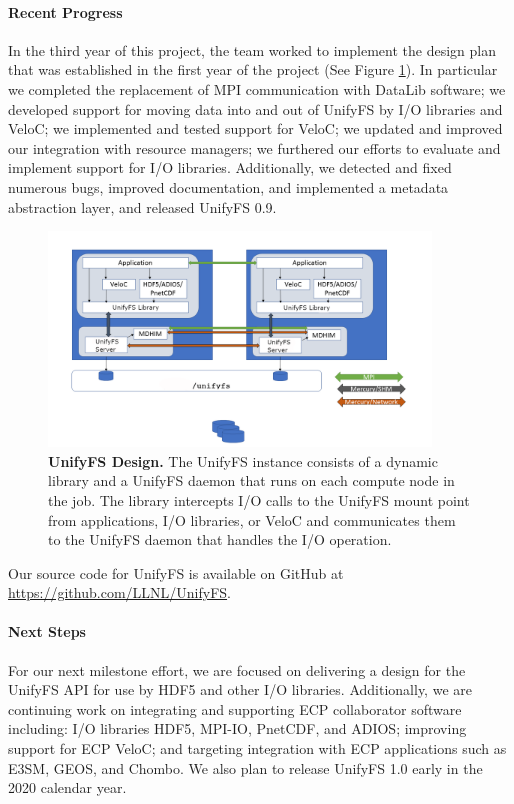 \paragraph{Recent Progress}

In the third year of this project, the team worked to implement the
design plan that was established in the first
year of the project (See Figure \ref{fig:milestone2}). In particular
we completed the replacement of MPI communication with DataLib software; we developed
support for moving data into and out of UnifyFS by I/O libraries and VeloC;
we implemented and tested support for VeloC; we updated and improved our integration
with resource managers; we furthered our efforts to evaluate and implement support for I/O 
libraries. Additionally, we detected and fixed numerous bugs, improved documentation, and
implemented a metadata abstraction layer, and released UnifyFS 0.9.
\begin{figure}[htb]
        \centering
        \includegraphics[width=4in]{projects/2.3.4-DataViz/2.3.4.15-HDF5-UnifyCR/milestone2}
        \caption{\label{fig:milestone2} \textbf{UnifyFS Design.} The UnifyFS
instance consists of a dynamic library and a UnifyFS daemon that runs
on each compute node in the job. The library intercepts I/O calls to
the UnifyFS mount point from applications, I/O libraries, or VeloC and communicates them to the UnifyFS daemon that handles the I/O operation.}
\end{figure}


Our source code for UnifyFS is available on 
GitHub at \url{https://github.com/LLNL/UnifyFS}. 
\paragraph{Next Steps}

For our next milestone effort, we are focused on delivering a design for 
the UnifyFS API for use by HDF5 and other I/O libraries. Additionally, we are continuing work on 
integrating and supporting ECP collaborator software including:
I/O libraries HDF5, MPI-IO, PnetCDF, and ADIOS; improving
support for ECP VeloC; and targeting integration with ECP applications such as
E3SM, GEOS, and Chombo.
We also plan to release UnifyFS 1.0 early in the 2020 calendar year.



